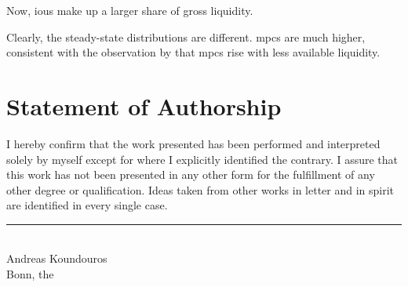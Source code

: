 \documentclass[12pt]{article} %
\numberwithin{equation}{section} %
\numberwithin{figure}{section}
\numberwithin{table}{section}
\begin{document}
\begin{refsection}
\begin{appendices}
Now, \Gls{iou}s make up a larger share of gross liquidity. 

Clearly, the steady-state distributions are different. \Gls{mpc}s are much higher, consistent with the observation by \textcite{kaplan2018} that \Gls{mpc}s rise with less available liquidity.

\end{appendices}
\newpage
\thispagestyle{plain}
\renewcommand*{\thepage}{A-\arabic{page}} %
\printbibliography[heading=subbibliography, title={Appendix References}]
\end{refsection}


\newpage
\thispagestyle{plain}
\section*{Statement of Authorship} %
I hereby confirm that the work presented has been performed and interpreted solely by myself except for where I explicitly identified the contrary. I assure that this work has not been presented in any other form for the fulfillment of any other degree or qualification. Ideas taken from other works in letter and in spirit are identified in every single case.

\vspace{2cm}
\noindent
\rule{8cm}{0.4pt}\\
Andreas Koundouros\\
Bonn, the 
\end{document}
